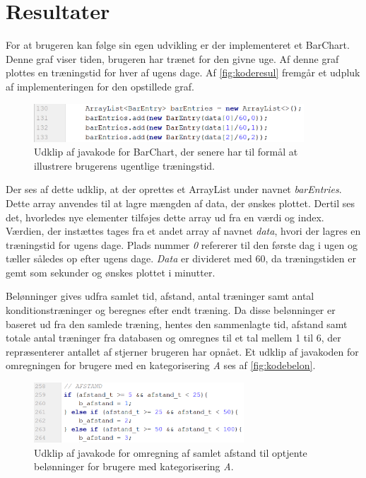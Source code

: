 \newpage
\section{Resultater}
For at brugeren kan følge sin egen udvikling er der implementeret et BarChart. Denne graf viser tiden, brugeren har trænet for den givne uge. Af denne graf plottes en træningstid for hver af ugens dage. Af \autoref{fig:koderesul} fremgår et udpluk af implementeringen for den opstillede graf.

\begin{figure} [H]
\centering
\includegraphics[width=0.9\textwidth]{figures/imple/koderesul}
\caption{Udklip af javakode for BarChart, der senere har til formål at illustrere brugerens ugentlige træningstid.}
\label{fig:koderesul}
\end{figure} 

\noindent
Der ses af dette udklip, at der oprettes et ArrayList under navnet \textit{barEntries}. Dette array anvendes til at lagre mængden af data, der ønskes plottet. Dertil ses det, hvorledes nye elementer tilføjes dette array ud fra en værdi og index. Værdien, der instættes tages fra et andet array af navnet \textit{data}, hvori der lagres en træningstid for ugens dage. Plads nummer \textit{0} refererer til den første dag i ugen og tæller således op efter ugens dage. \textit{Data} er divideret med 60, da træningstiden er gemt som sekunder og ønskes plottet i minutter. 

Belønninger gives udfra samlet tid, afstand, antal træninger samt antal konditionstræninger og beregnes efter endt træning. Da disse belønninger er baseret ud fra den samlede træning, hentes den sammenlagte tid, afstand samt totale antal træninger fra databasen og omregnes til et tal mellem 1 til 6, der repræsenterer antallet af stjerner brugeren har opnået. Et udklip af javakoden for omregningen for brugere med en kategorisering \textit{A} ses af \autoref{fig:kodebelon}.

\begin{figure} [H]
\centering
\includegraphics[width=0.7\textwidth]{figures/imple/kodebelon}
\caption{Udklip af javakode for omregning af samlet afstand til optjente belønninger for brugere med kategorisering \textit{A}.}
\label{fig:kodebelon}
\end{figure} 

